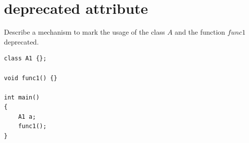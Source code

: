 \section{deprecated attribute}

\begin{Exercise}[title={deprecated attribute}, difficulty=2, label=ex023]
Describe a mechanism to mark the usage of the class $A$ and the function $func1$ deprecated.
\begin{lstlisting}
class A1 {};

void func1() {}

int main()
{
    A1 a;
    func1();
}
\end{lstlisting}

\end{Exercise}


